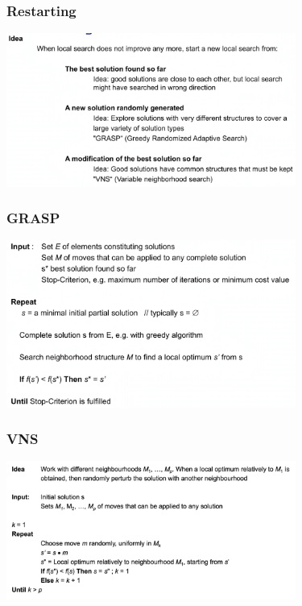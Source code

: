\documentclass[10pt,a4paper,twocolumn]{article}
\begin{document}
\subsubsection{Restarting}
\begin{center}
\includegraphics[width=9.5cm]{images/restarting}
\end{center}

\subsubsection{GRASP}
\begin{center}
\includegraphics[width=9.5cm]{images/grasp}
\end{center}

\subsubsection{VNS}
\begin{center}
\includegraphics[width=9.5cm]{images/vns}
\end{center}
\end{document}
